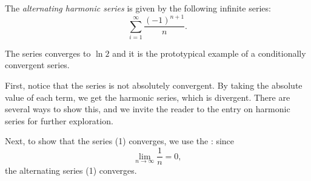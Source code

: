 \documentclass[12pt]{article}
\begin{document}
The \emph{alternating harmonic series} is given by the following infinite series:
\begin{equation}
\sum_{i=1}^{\infty} \frac{(-1)^{n+1}}{n}.
\end{equation}

The series converges to $\ln 2$ and it is the prototypical example of a conditionally convergent series.

First, notice that the series is not absolutely convergent.  By taking the absolute value of each term, we get the harmonic series, which is divergent.  There are several ways to show this, and we invite the reader to the entry on harmonic series for further exploration.

Next, to show that the series (1) converges, we use the : since $$\lim_{n\to \infty} \frac{1}{n}=0,$$ the alternating series (1) converges.
\end{document}
